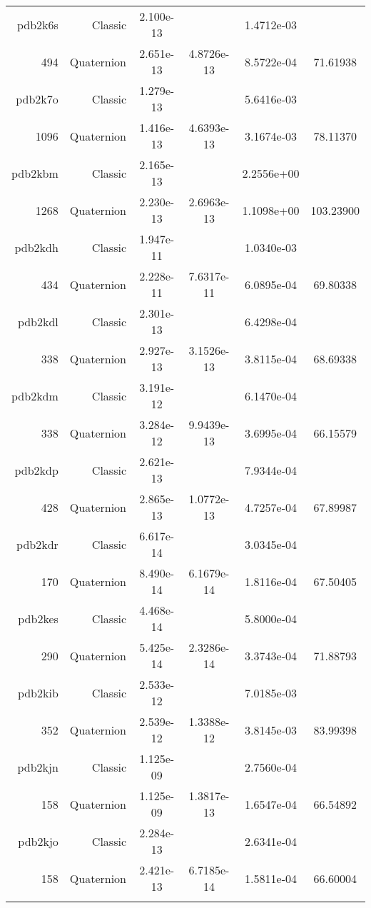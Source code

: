 \begin{xltabular}{\textwidth}{r|rS[table-format=1.3e+2]S[table-format=1.4e+2]S[table-format=1.4e+2]S[table-format=-1.5]}
pdb2k6s & Classic & 2.100e-13 &  & 1.4712e-03 & \\
494 & Quaternion & 2.651e-13 & 4.8726e-13 & 8.5722e-04 & 71.61938\\  \addlinespace
pdb2k7o & Classic & 1.279e-13 &  & 5.6416e-03 & \\
1096 & Quaternion & 1.416e-13 & 4.6393e-13 & 3.1674e-03 & 78.11370\\  \addlinespace
pdb2kbm & Classic & 2.165e-13 &  & 2.2556e+00 & \\
1268 & Quaternion & 2.230e-13 & 2.6963e-13 & 1.1098e+00 & 103.23900\\  \addlinespace
pdb2kdh & Classic & 1.947e-11 &  & 1.0340e-03 & \\
434 & Quaternion & 2.228e-11 & 7.6317e-11 & 6.0895e-04 & 69.80338\\  \addlinespace
pdb2kdl & Classic & 2.301e-13 &  & 6.4298e-04 & \\
338 & Quaternion & 2.927e-13 & 3.1526e-13 & 3.8115e-04 & 68.69338\\  \addlinespace
pdb2kdm & Classic & 3.191e-12 &  & 6.1470e-04 & \\
338 & Quaternion & 3.284e-12 & 9.9439e-13 & 3.6995e-04 & 66.15579\\  \addlinespace
pdb2kdp & Classic & 2.621e-13 &  & 7.9344e-04 & \\
428 & Quaternion & 2.865e-13 & 1.0772e-13 & 4.7257e-04 & 67.89987\\  \addlinespace
pdb2kdr & Classic & 6.617e-14 &  & 3.0345e-04 & \\
170 & Quaternion & 8.490e-14 & 6.1679e-14 & 1.8116e-04 & 67.50405\\  \addlinespace
pdb2kes & Classic & 4.468e-14 &  & 5.8000e-04 & \\
290 & Quaternion & 5.425e-14 & 2.3286e-14 & 3.3743e-04 & 71.88793\\  \addlinespace
pdb2kib & Classic & 2.533e-12 &  & 7.0185e-03 & \\
352 & Quaternion & 2.539e-12 & 1.3388e-12 & 3.8145e-03 & 83.99398\\  \addlinespace
pdb2kjn & Classic & 1.125e-09 &  & 2.7560e-04 & \\
158 & Quaternion & 1.125e-09 & 1.3817e-13 & 1.6547e-04 & 66.54892\\  \addlinespace
pdb2kjo & Classic & 2.284e-13 &  & 2.6341e-04 & \\
158 & Quaternion & 2.421e-13 & 6.7185e-14 & 1.5811e-04 & 66.60004\\  \addlinespace

\end{xltabular}
